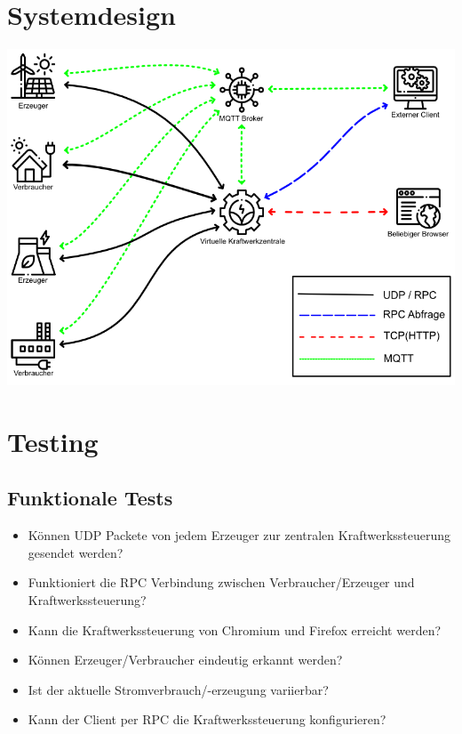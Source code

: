 \documentclass[
    fontsize=12pt,
    parskip=half
]{scrartcl}
\begin{document}
\section{Systemdesign}
\begin{center}
\includegraphics[width=\textwidth]{Systemdesign.png}
\end{center}

\section{Testing}

\subsection{Funktionale Tests}
    \begin{itemize}
        \item Können UDP Packete von jedem Erzeuger zur zentralen Kraftwerkssteuerung gesendet werden?
        \item Funktioniert die RPC Verbindung zwischen Verbraucher/Erzeuger und Kraftwerkssteuerung?
        \item Kann die Kraftwerkssteuerung von Chromium und Firefox erreicht werden?
        \item Können Erzeuger/Verbraucher eindeutig erkannt werden?
        \item Ist der aktuelle Stromverbrauch/-erzeugung variierbar?
        \item Kann der Client per RPC die Kraftwerkssteuerung konfigurieren?
    \end{itemize}
\end{document}
